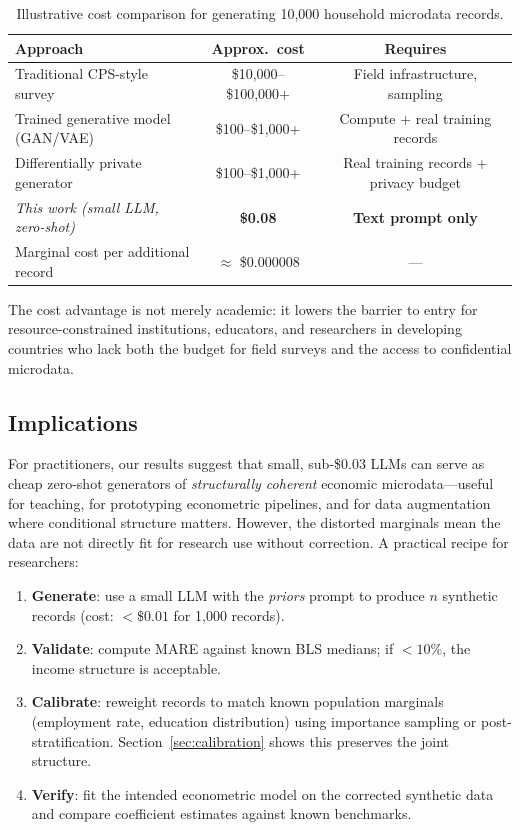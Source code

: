 \documentclass[11pt]{article}
\begin{document}
\begin{table}[htbp]
\centering
\caption{Illustrative cost comparison for generating 10{,}000 household microdata records.}
\label{tab:cost}
\small
\begin{tabular}{lcc}
\toprule
\textbf{Approach} & \textbf{Approx.\ cost} & \textbf{Requires} \\
\midrule
Traditional CPS-style survey & \$10{,}000--\$100{,}000+ & Field infrastructure, sampling \\
Trained generative model (GAN/VAE) & \$100--\$1{,}000+ & Compute + real training records \\
Differentially private generator & \$100--\$1{,}000+ & Real training records + privacy budget \\
\emph{This work (small LLM, zero-shot)} & \textbf{\$0.08} & \textbf{Text prompt only} \\
\midrule
Marginal cost per additional record & $\approx$ \$0.000008 & --- \\
\bottomrule
\end{tabular}
\end{table}

The cost advantage is not merely academic: it lowers the barrier to entry for resource-constrained institutions, educators, and researchers in developing countries who lack both the budget for field surveys and the access to confidential microdata.

\subsection{Implications}

For practitioners, our results suggest that small, sub-\$0.03 LLMs can serve as cheap zero-shot generators of \emph{structurally coherent} economic microdata---useful for teaching, for prototyping econometric pipelines, and for data augmentation where conditional structure matters.
However, the distorted marginals mean the data are not directly fit for research use without correction.
A practical recipe for researchers:

\begin{enumerate}[leftmargin=*, itemsep=1pt]
  \item \textbf{Generate}: use a small LLM with the \emph{priors} prompt to produce $n$ synthetic records (cost: $<\$0.01$ for 1{,}000 records).
  \item \textbf{Validate}: compute MARE against known BLS medians; if $< 10\%$, the income structure is acceptable.
  \item \textbf{Calibrate}: reweight records to match known population marginals (employment rate, education distribution) using importance sampling or post-stratification. Section~\ref{sec:calibration} shows this preserves the joint structure.
  \item \textbf{Verify}: fit the intended econometric model on the corrected synthetic data and compare coefficient estimates against known benchmarks.
\end{enumerate}
\end{document}
